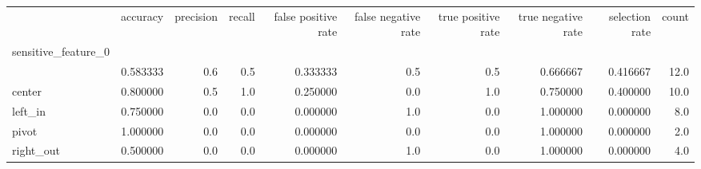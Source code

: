 \begin{tabular}{lrrrrrrrrr}
\toprule
{} &  accuracy &  precision &  recall &  false positive rate &  false negative rate &  true positive rate &  true negative rate &  selection rate &  count \\
sensitive\_feature\_0 &           &            &         &                      &                      &                     &                     &                 &        \\
\midrule
                    &  0.583333 &        0.6 &     0.5 &             0.333333 &                  0.5 &                 0.5 &            0.666667 &        0.416667 &   12.0 \\
center              &  0.800000 &        0.5 &     1.0 &             0.250000 &                  0.0 &                 1.0 &            0.750000 &        0.400000 &   10.0 \\
left\_in             &  0.750000 &        0.0 &     0.0 &             0.000000 &                  1.0 &                 0.0 &            1.000000 &        0.000000 &    8.0 \\
pivot               &  1.000000 &        0.0 &     0.0 &             0.000000 &                  0.0 &                 0.0 &            1.000000 &        0.000000 &    2.0 \\
right\_out           &  0.500000 &        0.0 &     0.0 &             0.000000 &                  1.0 &                 0.0 &            1.000000 &        0.000000 &    4.0 \\
\bottomrule
\end{tabular}
